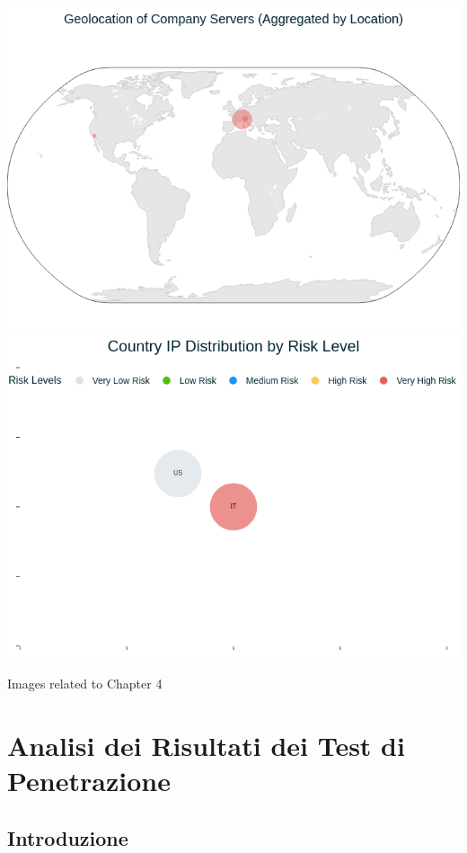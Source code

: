 \begin{center}
\includegraphics[width=\linewidth]{pngs/3_1.png}
\vspace{1cm}\includegraphics[width=\linewidth]{pngs/3_2.png}
\vspace{1cm}\caption{Images related to Chapter 4}
\end{center}
\chapter{Analisi dei Risultati dei Test di Penetrazione}

\section{Introduzione}

